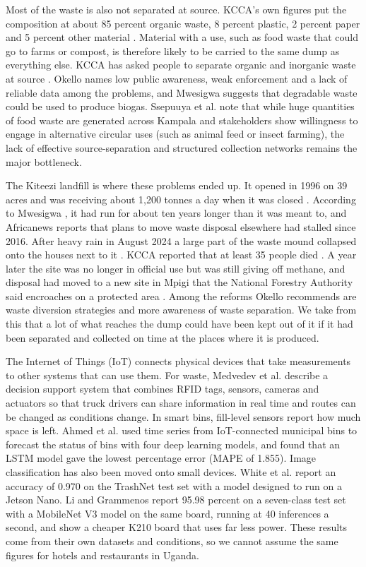 \documentclass[12pt,a4paper]{report}
\begin{document}
Most of the waste is also not separated at source. KCCA's own figures put the composition at about 85 percent organic waste, 8 percent plastic, 2 percent paper and 5 percent other material \cite{kcca2026}. Material with a use, such as food waste that could go to farms or compost, is therefore likely to be carried to the same dump as everything else. KCCA has asked people to separate organic and inorganic waste at source \cite{kccand}. Okello \cite{okello} names low public awareness, weak enforcement and a lack of reliable data among the problems, and Mwesigwa \cite{mwesigwa} suggests that degradable waste could be used to produce biogas. Ssepuuya et al. \cite{ssepuuya} note that while huge quantities of food waste are generated across Kampala and stakeholders show willingness to engage in alternative circular uses (such as animal feed or insect farming), the lack of effective source-separation and structured collection networks remains the major bottleneck.

The Kiteezi landfill is where these problems ended up. It opened in 1996 on 39 acres and was receiving about 1,200 tonnes a day when it was closed \cite{kcca2026}. According to Mwesigwa \cite{mwesigwa}, it had run for about ten years longer than it was meant to, and Africanews \cite{africanews} reports that plans to move waste disposal elsewhere had stalled since 2016. After heavy rain in August 2024 a large part of the waste mound collapsed onto the houses next to it \cite{petley,okello}. KCCA reported that at least 35 people died \cite{kcca2024b}. A year later the site was no longer in official use but was still giving off methane, and disposal had moved to a new site in Mpigi that the National Forestry Authority said encroaches on a protected area \cite{afp}. Among the reforms Okello \cite{okello} recommends are waste diversion strategies and more awareness of waste separation. We take from this that a lot of what reaches the dump could have been kept out of it if it had been separated and collected on time at the places where it is produced.

The Internet of Things (IoT) connects physical devices that take measurements to other systems that can use them. For waste, Medvedev et al. \cite{medvedev} describe a decision support system that combines RFID tags, sensors, cameras and actuators so that truck drivers can share information in real time and routes can be changed as conditions change. In smart bins, fill-level sensors report how much space is left. Ahmed et al. \cite{ahmed} used time series from IoT-connected municipal bins to forecast the status of bins with four deep learning models, and found that an LSTM model gave the lowest percentage error (MAPE of 1.855). Image classification has also been moved onto small devices. White et al. \cite{white} report an accuracy of 0.970 on the TrashNet test set with a model designed to run on a Jetson Nano. Li and Grammenos \cite{li} report 95.98 percent on a seven-class test set with a MobileNet V3 model on the same board, running at 40 inferences a second, and show a cheaper K210 board that uses far less power. These results come from their own datasets and conditions, so we cannot assume the same figures for hotels and restaurants in Uganda.
\end{document}
